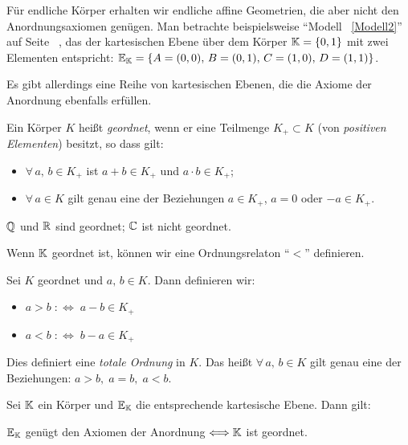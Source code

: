 Für endliche Körper erhalten wir endliche affine Geometrien, die aber nicht den Anordnungsaxiomen
genügen. Man betrachte beispielsweise "`Modell ~\ref{Modell2}"' auf Seite ~\pageref{Modell2}, das
der kartesischen Ebene über dem Körper $\mathbb K = \{0, 1\}$ mit zwei Elementen entspricht: $\mathbb E_{\mathbb K} = \{A
= (0,0),\, B = (0,1),\, C = (1,0),\, D = (1,1)\}$.

\begin{figure}[ht]
    
\end{figure}

Es gibt allerdings eine Reihe von kartesischen Ebenen, die die Axiome der Anordnung ebenfalls
erfüllen.

\begin{defi}
    Ein Körper $K$ heißt {\em geordnet}, wenn er eine Teilmenge $K_+\subset K$ (von {\em positiven
    Elementen}) besitzt, so dass gilt:
    \renewcommand{\labelenumi}{(\roman{enumi})} %
    \begin{itemize}
        \item $\forall\, a,\, b \in K_+$ ist $a + b \in K_+$ und $a \cdot b \in K_+$;

        \item $\forall\, a \in K$ gilt genau eine der Beziehungen $a \in K_+$, $a = 0$ oder $-a \in
        K_+$.
    \end{itemize}
\end{defi}

$\mathbb Q$ und $\mathbb R$ sind geordnet; $\mathbb C$ ist nicht geordnet.

Wenn $\mathbb K$ geordnet ist, können wir eine Ordnungsrelaton "`$<$"' definieren.

\begin{defi}
    Sei $K$ geordnet und $a,\, b \in K$. Dann definieren wir:
    \begin{itemize}
        \item $a > b\;: \Longleftrightarrow\; a - b \in K_+$

        \item $a < b\;: \Longleftrightarrow\; b - a\in K_+$
    \end{itemize}
\end{defi}

Dies definiert eine {\em totale Ordnung} in $K$. Das heißt $\forall\, a,\, b \in K$ gilt genau eine
der Beziehungen: $a > b,\; a = b,\; a < b$.

\begin{thm}
    Sei $\mathbb K$ ein Körper und $\mathbb E_{\mathbb K}$ die entsprechende kartesische Ebene. Dann gilt:
    \begin{center}
        $\mathbb E_{\mathbb K}$ genügt den Axiomen der Anordnung $\Longleftrightarrow \mathbb K$ ist geordnet.
    \end{center}
\end{thm}


